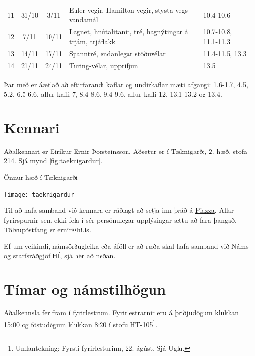 \documentclass[justified, nobib]{tufte-handout}
\begin{document}
\begin{table}
\begin{center}
\begin{tabularx}{\linewidth}{lccXp{3cm}}
11	&31/10	&3/11	& Euler-vegir, Hamilton-vegir, stysta-vegs vandamál                                                     &10.4-10.6\\
12	&7/11	&10/11	& Lagnet, hnútalitanir, tré, hagnýtingar á trjám, trjáflakk                                             &10.7-10.8, 11.1-11.3\\
13	&14/11	&17/11	& Spanntré, endanlegar stöðuvélar                                                                       &11.4-11.5, 13.3\\
14	&21/11	&24/11	& Turing-vélar, upprifjun                                                                               &13.5\\
\bottomrule
\end{tabularx}
\end{center}
\end{table}

Þar með er áætlað að eftirfarandi kaflar og undirkaflar mæti afgangi: 1.6-1.7, 4.5, 5.2, 6.5-6.6, allur kafli 7, 8.4-8.6, 9.4-9.6, allur kafli 12, 13.1-13.2 og 13.4.

\section{Kennari}
Aðalkennari er Eiríkur Ernir Þorsteinsson. Aðsetur er í Tæknigarði, 2. hæð, stofa 214. Sjá mynd \ref{fig:taeknigardur}.

\begin{marginfigure}
\caption{Önnur hæð í Tæknigarði}
\label{fig:taeknigardur}
\begin{center}
\texttt{[image: taeknigardur]}
\end{center}
\end{marginfigure}

Til að hafa samband við kennara er ráðlagt að setja inn þráð á \href{piazza.com/hi.is/fall2017/tl104g/home}{Piazza}. Allar fyrirspurnir sem ekki fela í sér persónulegar upplýsingar ættu að fara þangað. Tölvupóstfang er \href{mailto:ernir@hi.is}{ernir@hi.is}.

Ef um veikindi, námsörðugleika eða áföll er að ræða skal hafa samband við Náms- og starfsráðgjöf HÍ, sjá  hér að neðan.
\section{Tímar og námstilhögun}
Aðalkennsla fer fram í fyrirlestrum. Fyrirlestrarnir eru á þriðjudögum klukkan 15:00 og föstudögum klukkan 8:20 í stofu HT-105\footnote{Undantekning: Fyrsti fyrirlesturinn, 22. ágúst. Sjá Uglu.}.
\end{document}
